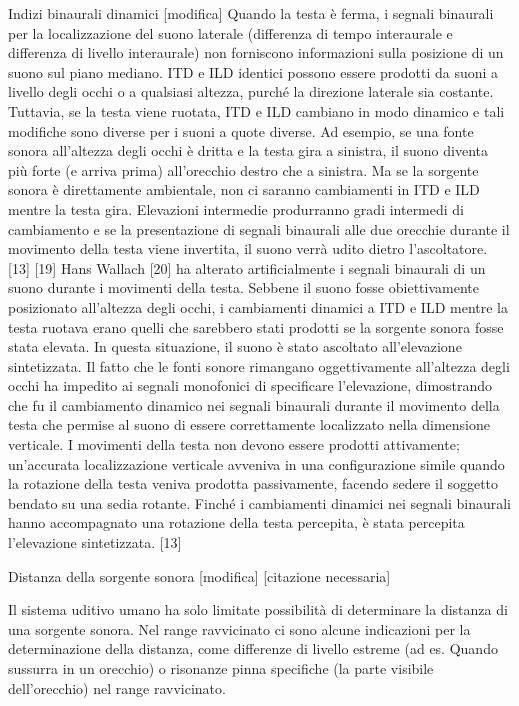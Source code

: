 {Indizi binaurali dinamici [modifica]
Quando la testa è ferma, i segnali binaurali per la localizzazione del suono laterale (differenza di tempo interaurale e differenza di livello interaurale) non forniscono informazioni sulla posizione di un suono sul piano mediano. ITD e ILD identici possono essere prodotti da suoni a livello degli occhi o a qualsiasi altezza, purché la direzione laterale sia costante. Tuttavia, se la testa viene ruotata, ITD e ILD cambiano in modo dinamico e tali modifiche sono diverse per i suoni a quote diverse. Ad esempio, se una fonte sonora all'altezza degli occhi è dritta e la testa gira a sinistra, il suono diventa più forte (e arriva prima) all'orecchio destro che a sinistra. Ma se la sorgente sonora è direttamente ambientale, non ci saranno cambiamenti in ITD e ILD mentre la testa gira. Elevazioni intermedie produrranno gradi intermedi di cambiamento e se la presentazione di segnali binaurali alle due orecchie durante il movimento della testa viene invertita, il suono verrà udito dietro l'ascoltatore. [13] [19] Hans Wallach [20] ha alterato artificialmente i segnali binaurali di un suono durante i movimenti della testa. Sebbene il suono fosse obiettivamente posizionato all'altezza degli occhi, i cambiamenti dinamici a ITD e ILD mentre la testa ruotava erano quelli che sarebbero stati prodotti se la sorgente sonora fosse stata elevata. In questa situazione, il suono è stato ascoltato all'elevazione sintetizzata. Il fatto che le fonti sonore rimangano oggettivamente all'altezza degli occhi ha impedito ai segnali monofonici di specificare l'elevazione, dimostrando che fu il cambiamento dinamico nei segnali binaurali durante il movimento della testa che permise al suono di essere correttamente localizzato nella dimensione verticale. I movimenti della testa non devono essere prodotti attivamente; un'accurata localizzazione verticale avveniva in una configurazione simile quando la rotazione della testa veniva prodotta passivamente, facendo sedere il soggetto bendato su una sedia rotante. Finché i cambiamenti dinamici nei segnali binaurali hanno accompagnato una rotazione della testa percepita, è stata percepita l'elevazione sintetizzata. [13]

Distanza della sorgente sonora [modifica]
[citazione necessaria]

Il sistema uditivo umano ha solo limitate possibilità di determinare la distanza di una sorgente sonora. Nel range ravvicinato ci sono alcune indicazioni per la determinazione della distanza, come differenze di livello estreme (ad es. Quando sussurra in un orecchio) o risonanze pinna specifiche (la parte visibile dell'orecchio) nel range ravvicinato.

}
